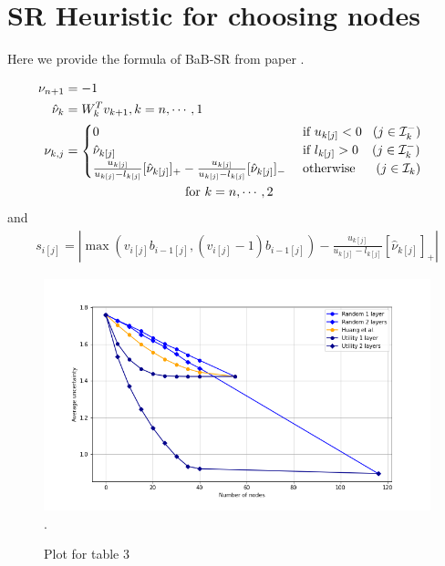 {{}












\section{SR Heuristic for choosing nodes}

Here we provide the formula of BaB-SR from paper \cite{BaB}.

\begin{align*}
	\nu_{n+1} &= -1&\\
	\hat{\nu}_k &= W^T_kv_{k+1}, k = n,\cdots,1 &\\
	\nu_{k,j} &= \begin{cases}
		0  &\text{ if }u_{k[j]}<0 \hspace*{2ex}(j\in\mathcal{I}^-_k)\\
		\hat{\nu}_{k[j]} &\text{ if }l_{k[j]}>0 \hspace*{2.5ex}(j\in\mathcal{I}^-_k)\\
		\frac{u_{k[j]}}{u_{k[j]}-l_{k[j]}}[\hat{\nu}_{k[j]}]_+-\frac{u_{k[j]}}{u_{k[j]}-l_{k[j]}}[\hat{\nu}_{k[j]}]_-  &\text{ otherwise } \hspace*{3ex}(j\in\mathcal{I}_k)\\ 
	\end{cases}\\
	&\hspace*{22ex}\text{for } k = n,\cdots,2&
\end{align*}and\begin{align*}
	s_{i[j]} = |\max(v_{i[j]}b_{i-1[j]},(v_{i[j]}-1)b_{i-1[j]})-\frac{u_{k[j]}}{u_{k[j]}-l_{k[j]}}[\hat{\nu}_{k[j]}]_+|
\end{align*}


\begin{figure}[b!]
	\hspace*{-0.8cm}
	\includegraphics[scale=0.6]{Plot for table 3}.
	\caption{Plot for table 3}
	\label{fig_table3}
\end{figure}


}
